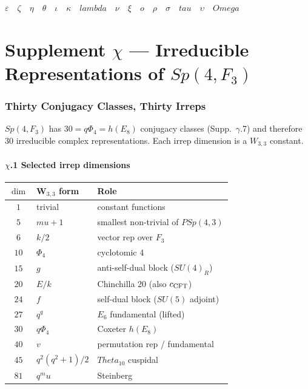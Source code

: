 \documentclass[12pt,a4paper]{article}
\def\mathbb#1{#1}%
\def\mathrm#1{#1}%
\def\lambda{lambda}%
\def\mu{mu}%
\def\Phi#1{Phi#1}%
\def\tau{tau}%
\def\Theta{Theta}%
\def\Omega{Omega}%
\theoremstyle{definition}
\newcommand{\Sp}{\mathrm{Sp}}
\newcommand{\PSp}{\mathrm{PSp}}
\newcommand{\SU}{\mathrm{SU}}
\newcommand{\FF}{\mathbb{F}}
\begin{document}
\hfill$\varepsilon\quad\zeta\quad\eta\quad\theta\quad\iota\quad\kappa\quad\lambda\quad\nu\quad\xi\quad o\quad\rho\quad\sigma\quad\tau\quad\upsilon\quad\Omega$

\clearpage
\part*{\texorpdfstring{Supplement $\chi$ --- Irreducible Representations of $\Sp(4,\FF_3)$}{Supplement chi --- Irreducible Representations of Sp(4,F3)}}

\section*{Thirty Conjugacy Classes, Thirty Irreps}

$\Sp(4,\FF_3)$ has $30 = q\Phi_4 = h(E_8)$ conjugacy classes
(Supp.~$\gamma$.7) and therefore 30 irreducible complex
representations. Each irrep dimension is a $W_{3,3}$ constant.

\subsection*{$\chi$.1 \quad Selected irrep dimensions}
\begin{center}
\renewcommand{\arraystretch}{1.4}
\begin{tabular}{cll}
\toprule
$\dim$ & W$_{3,3}$ form & Role \\
\midrule
$1$  & trivial & constant functions \\
$5$  & $\mu+1$ & smallest non-trivial of $\PSp(4,3)$ \\
$6$  & $k/2$ & vector rep over $\FF_3$ \\
$10$ & $\Phi_4$ & cyclotomic 4 \\
$15$ & $g$ & anti-self-dual block ($\SU(4)_R$) \\
$20$ & $E/k$ & Chinchilla 20 (also $c_{\rm CFT}$) \\
$24$ & $f$ & self-dual block ($\SU(5)$ adjoint) \\
$27$ & $q^q$ & $E_6$ fundamental (lifted) \\
$30$ & $q\Phi_4$ & Coxeter $h(E_8)$ \\
$40$ & $v$ & permutation rep / fundamental \\
$45$ & $q^2(q^2{+}1)/2$ & $\Theta_{10}$ cuspidal \\
$81$ & $q^\mu$ & Steinberg \\
\bottomrule
\end{tabular}
\end{center}
\end{document}
